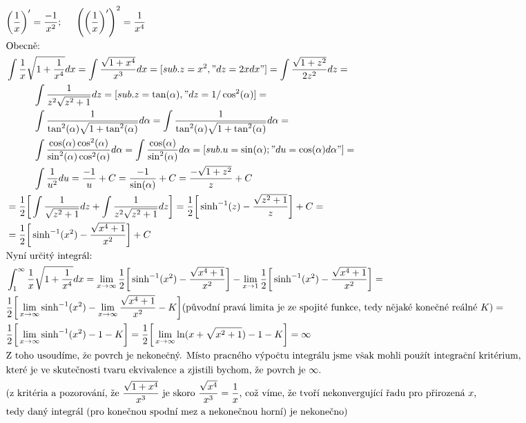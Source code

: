 \documentclass[a4paper]{article}
\begin{document}
\begin{align*}
& \bigg( \frac{1}{x} \bigg)' = \frac{-1}{x^2}; \hspace{0.5cm} \Bigg( \bigg( \frac{1}{x} \bigg)' \Bigg)^2 = \frac{1}{x^4} \\
& \text{Obecně:}\\
& \int \frac{1}{x} \sqrt{1+\frac{1}{x^4}} dx = \int \frac{\sqrt{1+x^4}}{x^3} dx = [sub. z=x^2, "dz=2x dx"] = \int \frac{\sqrt{1+z^2}}{2z^2} dz = \\
& \hspace{1cm} \int \frac{1}{z^2\sqrt{z^2+1}} dz = [sub. z = \tan(\alpha), "dz = 1/\cos^2(\alpha)] = \\
& \hspace{1cm} \int \frac{1}{\tan^2(\alpha) \sqrt{1+\tan^2(\alpha)}} d\alpha = \int \frac{1}{\tan^2(\alpha) \sqrt{1+\tan^2(\alpha)}} d\alpha = \\
& \hspace{1cm} \int \frac{\cos(\alpha) \cos^2(\alpha)}{\sin^2(\alpha)\cos^2(\alpha)} d\alpha = \int \frac{\cos(\alpha)}{\sin^2(\alpha)} d\alpha = [sub. u = \sin(\alpha); "du = \cos(\alpha) d\alpha"] = \\
& \hspace{1cm} \int \frac{1}{u^2} du = \frac{-1}{u} + C = \frac{-1}{\sin(\alpha)} +C = \frac{-\sqrt{1+z^2}}{z} + C \\
& = \frac{1}{2} \bigg[ \int \frac{1}{\sqrt{z^2+1}} dz + \int \frac{1}{z^2\sqrt{z^2+1}} dz \bigg] = \frac{1}{2} \bigg[ \sinh^{-1}(z) - \frac{\sqrt{z^2+1}}{z} \bigg] + C = \\
& = \frac{1}{2} \bigg[ \sinh^{-1}(x^2) - \frac{\sqrt{x^4+1}}{x^2}\bigg] + C \\
& \text{Nyní určitý integrál:} \\
& \int_1^\infty \frac{1}{x} \sqrt{1+\frac{1}{x^4}} dx = \lim_{x \rightarrow \infty} \frac{1}{2} \bigg[ \sinh^{-1}(x^2) - \frac{\sqrt{x^4+1}}{x^2}\bigg] - \lim_{x \rightarrow 1} \frac{1}{2} \bigg[ \sinh^{-1}(x^2) - \frac{\sqrt{x^4+1}}{x^2}\bigg] = \\
& \frac{1}{2} \bigg[ \lim_{x \rightarrow \infty}  \sinh^{-1}(x^2) - \lim_{x \rightarrow \infty}  \frac{\sqrt{x^4+1}}{x^2} - K \bigg] \text{(původní pravá limita je ze spojité funkce, tedy nějaké konečné reálné $K$)} = \\
& \frac{1}{2} \bigg[ \lim_{x \rightarrow \infty}  \sinh^{-1}(x^2) - 1 - K \bigg] = \frac{1}{2} \bigg[ \lim_{x \rightarrow \infty}  \ln(x+\sqrt{x^2+1}) - 1 - K \bigg] = \infty \\
& \text{Z toho usoudíme, že povrch je nekonečný. Místo pracného výpočtu integrálu jsme však mohli použít integrační kritérium,} \\
& \text{které je ve skutečnosti tvaru ekvivalence a zjistili bychom, že povrch je $\infty$.} \\
& \text{(z kritéria a pozorování, že $\frac{\sqrt{1+x^4}}{x^3}$ je skoro $\frac{\sqrt{x^4}}{x^3}=\frac{1}{x}$, což víme, že tvoří nekonvergující řadu pro přirozená $x$,} \\
& \text{tedy daný integrál (pro konečnou spodní mez a nekonečnou horní) je nekonečno)} 
\end{align*}
\end{document}

